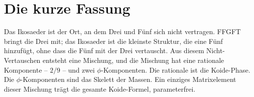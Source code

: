 \section{Die kurze Fassung}

Das Ikosaeder ist der Ort, an dem Drei und Fünf sich nicht vertragen. FFGFT
bringt die Drei mit; das Ikosaeder ist die kleinste Struktur, die eine Fünf
hinzufügt, ohne dass die Fünf mit der Drei vertauscht. Aus diesem
Nicht-Vertauschen entsteht eine Mischung, und die Mischung hat eine rationale
Komponente -- $2/9$ -- und zwei $\phi$-Komponenten. Die rationale ist die
Koide-Phase. Die $\phi$-Komponenten sind das Skelett der Massen. Ein einziges
Matrixelement dieser Mischung trägt die gesamte Koide-Formel, parameterfrei.
